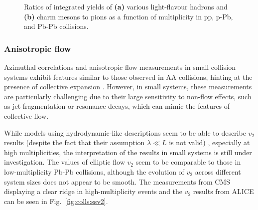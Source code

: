 \begin{figure}[H]
\hspace{2em}
\caption{Ratios of integrated yields of \textbf{(a)} various light-flavour hadrons \cite{adamEnhancedProductionMultistrange2017} and \textbf{(b)} charm mesons \cite{alicecollaborationMultiplicityDependencePsi2020, alicecollaborationObservationMultiplicityDependence2022} to pions as a function of multiplicity in pp, p-Pb, and Pb-Pb collisions. \cite{alicecollaborationALICEExperimentJourney2022}}
\label{fig:colls:ssstrangeness}
\end{figure}

\subsubsection*{Anisotropic flow}

Azimuthal correlations and anisotropic flow measurements in small collision systems exhibit features similar to those observed in AA collisions, hinting at the presence of collective expansion \cite{cmscollaborationEvidenceCollectivityPp2017}. However, in small systems, these measurements are particularly challenging due to their large sensitivity to non-flow effects, such as jet fragmentation or resonance decays, which can mimic the features of collective flow. 

While models using hydrodynamic-like descriptions seem to be able to describe $v_2$ results (despite the fact that their assumption $\lambda \ll L$ is not valid) \cite{wellerOneFluidRule2017}, especially at high multiplicities, the interpretation of the results in small systems is still under investigation. The values of elliptic flow $v_2$ seem to be comparable to those in low-multiplicity Pb-Pb collisions, although the evolution of $v_2$ across different system sizes does not appear to be smooth. The measurements from CMS displaying a clear ridge in high-multiplicity events \cite{cmscollaborationEvidenceCollectivityPp2017} and the $v_2$ results from ALICE \cite{alicecollaborationInvestigationsAnisotropicFlow2019} can be seen in Fig.~\ref{fig:colls:ssv2}.

